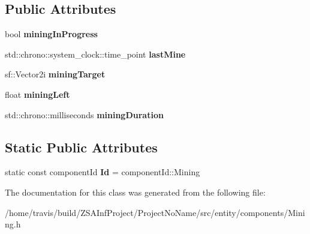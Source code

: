 \subsection*{Public Attributes}
\begin{DoxyCompactItemize}
\item 
\hypertarget{classMiningComponent_aa2712cd77842e48c59a6f833b2a82b02}{bool {\bfseries mining\-In\-Progress}}\label{classMiningComponent_aa2712cd77842e48c59a6f833b2a82b02}

\item 
\hypertarget{classMiningComponent_aa0638ca5c9f3b95c32dff8ef5d26fa75}{std\-::chrono\-::system\-\_\-clock\-::time\-\_\-point {\bfseries last\-Mine}}\label{classMiningComponent_aa0638ca5c9f3b95c32dff8ef5d26fa75}

\item 
\hypertarget{classMiningComponent_a0a6983db22da86ecc29b3b9de2839f57}{sf\-::\-Vector2i {\bfseries mining\-Target}}\label{classMiningComponent_a0a6983db22da86ecc29b3b9de2839f57}

\item 
\hypertarget{classMiningComponent_ae6a3dcd631af87b6b3a1689decae48f9}{float {\bfseries mining\-Left}}\label{classMiningComponent_ae6a3dcd631af87b6b3a1689decae48f9}

\item 
\hypertarget{classMiningComponent_aded0ebeadbb97fc5aaf786f6ea46d5c4}{std\-::chrono\-::milliseconds {\bfseries mining\-Duration}}\label{classMiningComponent_aded0ebeadbb97fc5aaf786f6ea46d5c4}

\end{DoxyCompactItemize}
\subsection*{Static Public Attributes}
\begin{DoxyCompactItemize}
\item 
\hypertarget{classMiningComponent_a24a9633347f99679bda0953660def2e6}{static const component\-Id {\bfseries Id} = component\-Id\-::\-Mining}\label{classMiningComponent_a24a9633347f99679bda0953660def2e6}

\end{DoxyCompactItemize}


The documentation for this class was generated from the following file\-:\begin{DoxyCompactItemize}
\item 
/home/travis/build/\-Z\-S\-A\-Inf\-Project/\-Project\-No\-Name/src/entity/components/Mining.\-h\end{DoxyCompactItemize}
